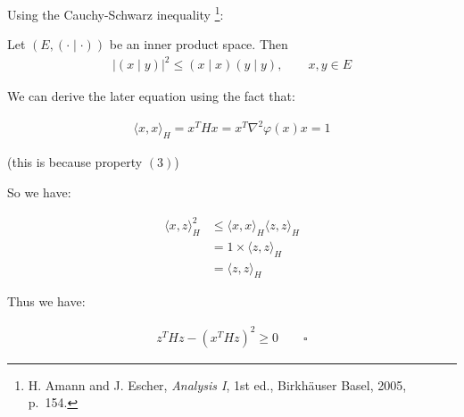 \documentclass{article}
\begin{document}
Using the Cauchy-Schwarz inequality
\footnote{H. Amann and J. Escher, \textit{Analysis I}, 1st ed., Birkhäuser Basel, 2005, p.~154.}:
\bigskip

\begin{tcolorbox}[greenbox, title = Cauchy-Schwarz inequality]
    Let $(E, (\cdot \mid \cdot))$ be an inner product space. Then  
    \begin{align*}
        |(x \mid y)|^2 \leq (x \mid x)(y \mid y), \qquad x,y \in E
    \end{align*}
\end{tcolorbox}

We can derive the later equation using the fact that:

\begin{align*}
    \langle x, x \rangle_H = x^T H x = x^T \nabla^2 \varphi ( x ) x = 1
\end{align*}

(this is because property $(3)$)

So we have:

\begin{align*}
    \langle x, z \rangle_H^2 
    &\leq \langle x, x \rangle_H \langle z, z \rangle_H \\
    &= 1 \times \langle z, z \rangle_H \\
    &= \langle z, z \rangle_H
\end{align*}

Thus we have:

\begin{align*}
    z^T H z - (x^T H z)^2 \geq 0 \qquad \square
\end{align*}
\end{document}
